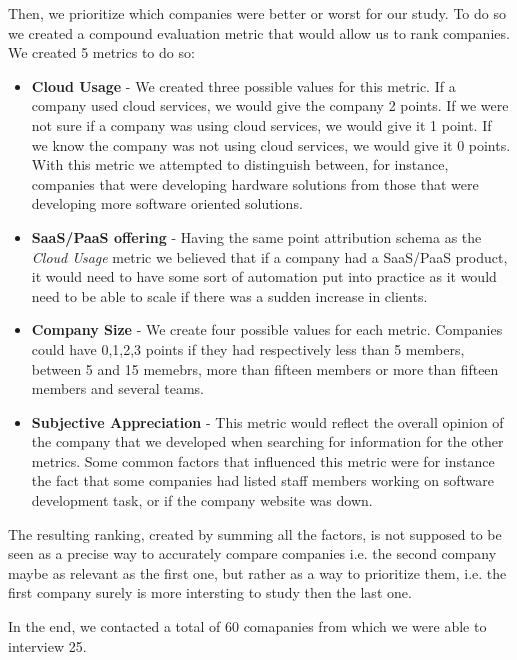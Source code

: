       Then, we prioritize which companies were better or worst for our study. To do so we created a compound evaluation metric that would allow us to rank companies. We created 5 metrics to do so:
      \begin{itemize}
        \item \textbf{Cloud Usage} - We created three possible values for this metric. If a company used cloud services, we would give the company 2 points. If we were not sure if a company was using cloud services, we would give it 1 point. If we know the company was not using cloud services, we would give it 0 points. With this metric we attempted to distinguish between, for instance, companies that were developing hardware solutions from those that were developing more software oriented solutions.

        \item \textbf{SaaS/PaaS offering} - Having the same point attribution schema as the \textit{Cloud Usage} metric we believed that if a company had a SaaS/PaaS product, it would need to have some sort of automation put into practice as it would need to be able to scale if there was a sudden increase in clients.

        \item \textbf{Company Size} - We create four possible values for each metric. Companies could have 0,1,2,3 points if they had respectively less than 5 members, between 5 and 15 memebrs, more than fifteen members or more than fifteen members and several teams.

        \item \textbf{Subjective Appreciation} - This metric would reflect the overall opinion of the company that we developed when searching for information for the other metrics. Some common factors that influenced this metric were for instance the fact that some companies had listed staff members working on software development task, or if the company website was down.
      \end{itemize}

      The resulting ranking, created by summing all the factors, is not supposed to be seen as a precise way to accurately compare companies i.e. the second company maybe as relevant as the first one, but rather as a way to prioritize them, i.e. the first company surely is more intersting to study then the last one.

      In the end, we contacted a total of 60 comapanies from which we were able to interview 25.

